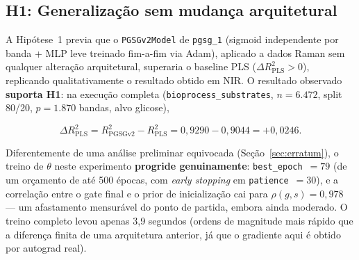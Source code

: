%
%

\subsection{H1: Generalização sem mudança arquitetural}
\label{sec:results-h1}

A Hipótese~1 previa que o \texttt{PGSGv2Model} de \texttt{pgsg\_1} (sigmoid independente por banda + MLP leve treinado fim-a-fim via Adam), aplicado a dados Raman sem qualquer alteração arquitetural, superaria o baseline PLS ($\Delta R^2_{\text{PLS}} > 0$), replicando qualitativamente o resultado obtido em NIR. O resultado observado \textbf{suporta H1}: na execução completa (\texttt{bioprocess\_substrates}, $n=6.472$, split 80/20, $p=1.870$ bandas, alvo glicose),

\[
\Delta R^2_{\text{PLS}} = R^2_{\text{PGSGv2}} - R^2_{\text{PLS}} = 0{,}9290 - 0{,}9044 = +0{,}0246.
\]

Diferentemente de uma análise preliminar equivocada (Seção~\ref{sec:erratum}), o treino de $\theta$ neste experimento \textbf{progride genuinamente}: \texttt{best\_epoch}~$=79$ (de um orçamento de até 500 épocas, com \emph{early stopping} em \texttt{patience}~$=30$), e a correlação entre o gate final e o prior de inicialização cai para $\rho(g,s)=0{,}978$ --- um afastamento mensurável do ponto de partida, embora ainda moderado. O treino completo levou apenas 3,9 segundos (ordens de magnitude mais rápido que a diferença finita de uma arquitetura anterior, já que o gradiente aqui é obtido por autograd real).


